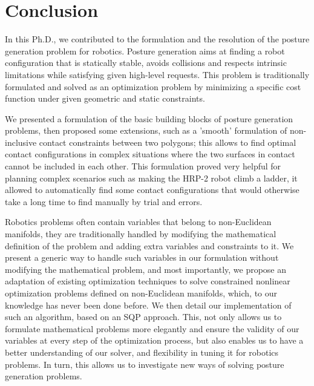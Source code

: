 

\chapter*{Conclusion}
\label{cha:conclusion}

In this Ph.D., we contributed to the formulation and the resolution of the posture generation problem for robotics.
Posture generation aims at finding a robot configuration that is statically stable, avoids collisions and respects intrinsic limitations while satisfying given high-level requests.
This problem is traditionally formulated and solved as an optimization problem by minimizing a specific cost function under given geometric and static constraints.

We presented a formulation of the basic building blocks of posture generation problems, then proposed some extensions, such as a 'smooth' formulation of non-inclusive contact constraints between two polygons; this allows to find optimal contact configurations in complex situations where the two surfaces in contact cannot be included in each other.
This formulation proved very helpful for planning complex scenarios such as making the HRP-2 robot climb a ladder, it allowed to automatically find some contact configurations that would otherwise take a long time to find manually by trial and errors.

Robotics problems often contain variables that belong to non-Euclidean manifolds, they are traditionally handled by modifying the mathematical definition of the problem and adding extra variables and constraints to it.
We present a generic way to handle such variables in our formulation without modifying the mathematical problem, and most importantly, we propose an adaptation of existing optimization techniques to solve constrained nonlinear optimization problems defined on non-Euclidean manifolds, which, to our knowledge has never been done before.
We then detail our implementation of such an algorithm, based on an SQP approach.
This, not only allows us to formulate mathematical problems more elegantly and ensure the validity of our variables at every step of the optimization process, but also enables us to have a better understanding of our solver, and flexibility in tuning it for robotics problems.
In turn, this allows us to investigate new ways of solving posture generation problems.

